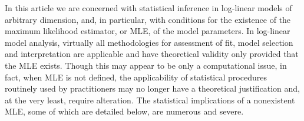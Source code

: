 \documentclass[aos,MSNbibl,nameyear,dvips]{arximspdf}
\begin{document}
In this article we are concerned with statistical inference in
log-linear models of arbitrary dimension,
and, in particular, with conditions for the existence of the maximum
likelihood estimator, or MLE, of the
model parameters. In log-linear model analysis, virtually all
methodologies for assessment of fit, model
selection and interpretation are applicable and have theoretical
validity only provided that the MLE exists.
Though this may appear to be only a computational issue, in fact, when
MLE is not defined, the applicability of statistical procedures
routinely used by practitioners may no longer have a theoretical
justification and, at the very least, require alteration. The
statistical implications of a nonexistent MLE, some of which are
detailed below, are numerous and severe.
\end{document}
